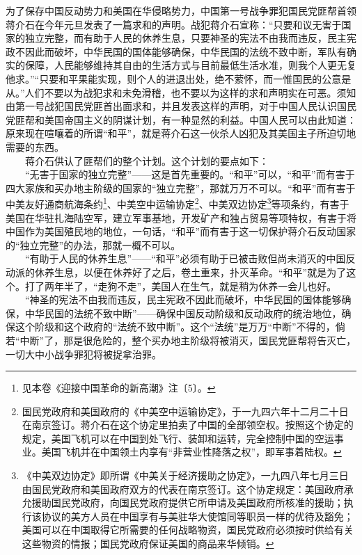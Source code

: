 \documentclass[cn,11pt,chinese]{elegantbook}
\begin{document}
为了保存中国反动势力和美国在华侵略势力，中国第一号战争罪犯国民党匪帮首领蒋介石在今年元旦发表了一篇求和的声明。战犯蒋介石宣称：“只要和议无害于国家的独立完整，而有助于人民的休养生息，只要神圣的宪法不由我而违反，民主宪政不因此而破坏，中华民国的国体能够确保，中华民国的法统不致中断，军队有确实的保障，人民能够维持其自由的生活方式与目前最低生活水准，则我个人更无复他求。”“只要和平果能实现，则个人的进退出处，绝不萦怀，而一惟国民的公意是从。”人们不要以为战犯求和未免滑稽，也不要以为这样的求和声明实在可恶。须知由第一号战犯国民党匪首出面求和，并且发表这样的声明，对于中国人民认识国民党匪帮和美国帝国主义的阴谋计划，有一种显然的利益。中国人民可以由此知道：原来现在喧嚷着的所谓“和平”，就是蒋介石这一伙杀人凶犯及其美国主子所迫切地需要的东西。\\
　　蒋介石供认了匪帮们的整个计划。这个计划的要点如下：\\
　　“无害于国家的独立完整”——这是首先重要的。“和平”可以，“和平”而有害于四大家族和买办地主阶级的国家的“独立完整”，那就万万不可以。“和平”而有害于中美友好通商航海条约\footnote[1]{ 见本卷《迎接中国革命的新高潮》注〔5〕。}、中美空中运输协定\footnote[2]{ 国民党政府和美国政府的《中美空中运输协定》，于一九四六年十二月二十日在南京签订。蒋介石在这个协定里拍卖了中国的全部领空权。按照这个协定的规定，美国飞机可以在中国到处飞行、装卸和运转，完全控制中国的空运事业。美国飞机并在中国领土内享有“非营业性降落之权”，即军事着陆权。}、中美双边协定\footnote[3]{ 《中美双边协定》即所谓《中美关于经济援助之协定》，一九四八年七月三日由国民党政府和美国政府双方的代表在南京签订。这个协定规定：美国政府承允援助国民党政府，向国民党政府提供它所申请及美国政府所核准的援助；执行该协议的美方人员在中国享有与美驻华大使馆同等职员一样的优待及豁免；美国可以在中国取得它所需要的任何战略物资，国民党政府必须按时供给有关这些物资的情报；国民党政府保证美国的商品来华倾销。}等项条约，有害于美国在华驻扎海陆空军，建立军事基地，开发矿产和独占贸易等项特权，有害于将中国作为美国殖民地的地位，一句话，“和平”而有害于这一切保护蒋介石反动国家的“独立完整”的办法，那就一概不可以。\\
　　“有助于人民的休养生息”——“和平”必须有助于已被击败但尚未消灭的中国反动派的休养生息，以便在休养好了之后，卷土重来，扑灭革命。“和平”就是为了这个。打了两年半了，“走狗不走”，美国人在生气，就是稍为休养一会儿也好。\\
　　“神圣的宪法不由我而违反，民主宪政不因此而破坏，中华民国的国体能够确保，中华民国的法统不致中断”——确保中国反动阶级和反动政府的统治地位，确保这个阶级和这个政府的“法统不致中断”。这个“法统”是万万“中断”不得的，倘若“中断”了，那是很危险的，整个买办地主阶级将被消灭，国民党匪帮将告灭亡，一切大中小战争罪犯将被捉拿治罪。\\
\end{document}
